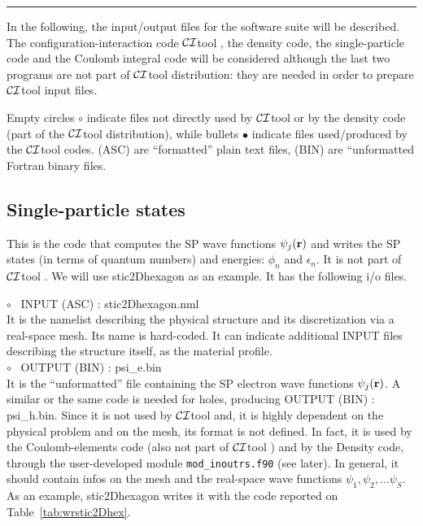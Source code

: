 \documentclass[12pt,twoside]{article}
\newcommand*{\CItool}[0]{{$\cal CI$}\textsf{tool} }
\begin{document}
\vspace{4mm}
\begin{center}
\rule{0.8\textwidth}{1pt}
\end{center}
\vspace{4mm}

In the following, the input/output files for the software suite will
be described.  The configuration-interaction code \CItool, the density
code, the single-particle code and the Coulomb integral code will be
considered although the last two programs are not part of \CItool
distribution: they are needed in order to prepare \CItool input files.

Empty circles $\circ$ indicate files not directly used by
\CItool or by the density code (part of the \CItool distribution),
while bullets $\bullet$ indicate files used/produced by the \CItool
codes. \textsf{(ASC)} are ``formatted'' plain text files, \textsf{(BIN)} 
are ``unformatted Fortran binary files.



\subsection*{Single-particle states}

This is the code that computes the SP wave functions $\psi_j({\bf r})$
and writes the SP states (in terms of quantum numbers) and energies:
$\phi_n$ and $\epsilon_n$.  It is not part of \CItool. We will use
\textsf{stic2Dhexagon} as an example. It has the following i/o files.

$\circ$ \ \textsf{INPUT (ASC) : stic2Dhexagon.nml} \\
It is the namelist describing the physical structure and its
discretization via a real-space mesh.  Its name is hard-coded.  It can
indicate additional \textsf{INPUT} files describing the structure
itself, as the material profile.
\\
$\circ$ \ \textsf{OUTPUT (BIN) : psi\_e.bin} \\ It is the
``unformatted'' file containing the SP electron wave functions
$\psi_j({\bf r})$.  A similar or the same code is needed for holes,
producing \textsf{OUTPUT (BIN) : psi\_h.bin}.  Since it is not used by
\CItool and, it is highly dependent on the physical problem
and on the mesh, its format is not defined.  In fact, it is used by
the Coulomb-elements code (also not part of \CItool) and by
the Density code, through the user-developed module
\verb#mod_inoutrs.f90# (see later).  In general, it should contain
infos on the mesh and the real-space wave functions 
$\psi_1, \psi_2, \dots \psi_S$. 
\\
As an example, \textsf{stic2Dhexagon} writes it with the code reported on
Table~\ref{tab:wrstic2Dhex}.
\end{document}
